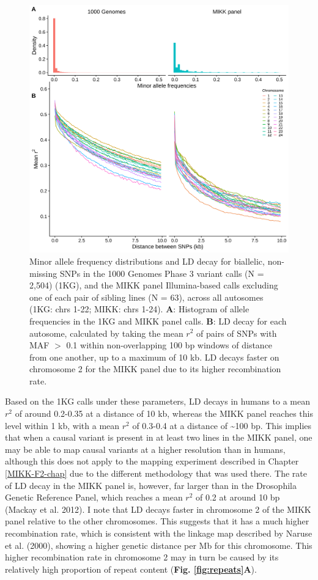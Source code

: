 \documentclass[
]{book}
\begin{document}
\begin{figure}
\includegraphics[width=1\linewidth]{figs/mikk_genome/08_ld_decay} \caption{Minor allele frequency distributions and LD decay for biallelic, non-missing SNPs in the 1000 Genomes Phase 3 variant calls (N = 2,504) (1KG), and the MIKK panel Illumina-based calls excluding one of each pair of sibling lines (N = 63), across all autosomes (1KG: chrs 1-22; MIKK: chrs 1-24). \textbf{A}: Histogram of allele frequencies in the 1KG and MIKK panel calls. \textbf{B}: LD decay for each autosome, calculated by taking the mean \(r^2\) of pairs of SNPs with MAF \(>\) 0.1 within non-overlapping 100 bp windows of distance from one another, up to a maximum of 10 kb. LD decays faster on chromosome 2 for the MIKK panel due to its higher recombination rate.}\label{fig:LDdecay}
\end{figure}

Based on the 1KG calls under these parameters, LD decays in humans to a mean \(r^2\) of around 0.2-0.35 at a distance of 10 kb, whereas the MIKK panel reaches this level within 1 kb, with a mean \(r^2\) of 0.3-0.4 at a distance of \textasciitilde100 bp. This implies that when a causal variant is present in at least two lines in the MIKK panel, one may be able to map causal variants at a higher resolution than in humans, although this does not apply to the mapping experiment described in Chapter \ref{MIKK-F2-chap} due to the different methodology that was used there. The rate of LD decay in the MIKK panel is, however, far larger than in the Drosophila Genetic Reference Panel, which reaches a mean \(r^2\) of 0.2 at around 10 bp (Mackay et al. 2012). I note that LD decays faster in chromosome 2 of the MIKK panel relative to the other chromosomes. This suggests that it has a much higher recombination rate, which is consistent with the linkage map described by Naruse et al. (2000), showing a higher genetic distance per Mb for this chromosome. This higher recombination rate in chromosome 2 may in turn be caused by its relatively high proportion of repeat content (\textbf{Fig. \ref{fig:repeats}A}).
\end{document}
